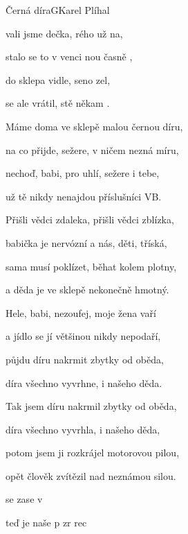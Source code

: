 \begin{song}{Černá díra}{G}{Karel Plíhal}

\begin{SBVerse}

vali jsme dečka, rého už na,

stalo se to v venci nou časně ,

 do sklepa  vidle,  seno zel,

 se ale vrátil, stě někam .

\end{SBVerse}

\begin{SBVerse}

Máme doma ve sklepě malou černou díru,

na co přijde, sežere, v ničem nezná míru,

nechoď, babi, pro uhlí, sežere i tebe,

už tě nikdy nenajdou příslušníci VB.

\end{SBVerse}

\begin{SBVerse}

Přišli vědci zdaleka, přišli vědci zblízka,

babička je nervózní a nás, děti, tříská,

sama musí poklízet, běhat kolem plotny,

a děda je ve sklepě nekonečně hmotný.

\end{SBVerse}

\begin{SBVerse}

Hele, babi, nezoufej, moje žena vaří

a jídlo se jí většinou nikdy nepodaří,

půjdu díru nakrmit zbytky od oběda,

díra všechno vyvrhne, i našeho děda.

\end{SBVerse}

\begin{SBVerse}

Tak jsem díru nakrmil zbytky od oběda,

díra všechno vyvrhla, i našeho děda,

potom jsem ji rozkrájel motorovou pilou,

opět člověk zvítězil nad neznámou silou.

\end{SBVerse}

\begin{SBVerse}

 se  zase v 

teď je naše p zr rec

\end{SBVerse}

\end{song}
\clearpage
